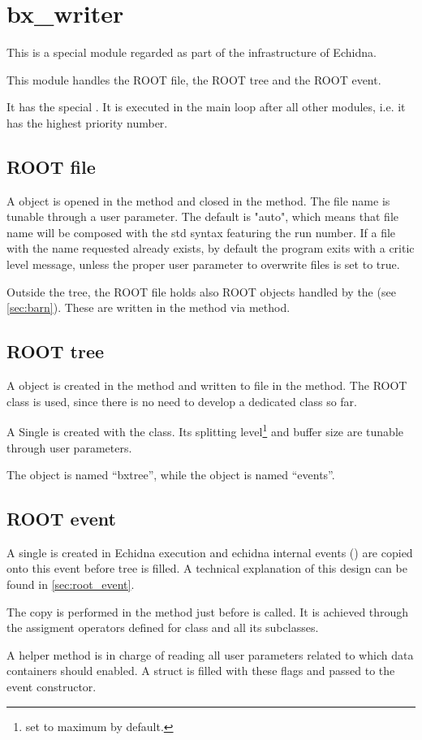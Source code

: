 \section{bx\_writer}
\label{sec:writer}

This is a special module regarded as part of the infrastructure of Echidna.

This module handles the ROOT file, the ROOT tree and the ROOT event.

It has the special .
It is executed in the main loop after all other modules, i.e. it has the highest priority number.

\subsection{ROOT file} 

A  object is opened in the  method and closed in the  method.
The file name is tunable through a user parameter.
The default is "auto", which means that file name will be composed with the std syntax featuring the run number.
If a file with the name requested already exists, by default the program exits with a critic level message, 
unless the proper user parameter to overwrite files is set to true.

Outside the tree, the ROOT file holds also ROOT objects handled by the  (see \ref{sec:barn}).
These are written in the  method via  method.


\subsection{ROOT tree}

A  object is created in the  method and written to file in the  method.
The ROOT  class is used, since there is no need to develop a dedicated class so far.

A Single  is created with the  class.
Its splitting level\footnote{set to maximum by default.} and buffer size are tunable through user parameters.

The  object is named ``bxtree'', while the  object is named ``events''.


\subsection{ROOT event}

A single  is created in Echidna execution and echidna internal events () are copied onto this event before tree is filled.
A technical explanation of this design can be found in \ref{sec:root_event}.

The copy is performed in the  method just before  is called. 
It is achieved through the assigment operators defined for  class and all its subclasses. 

A helper method  is in charge of reading all user parameters related to which data containers should enabled. 
A struct is filled with these flags and passed to the event constructor.
